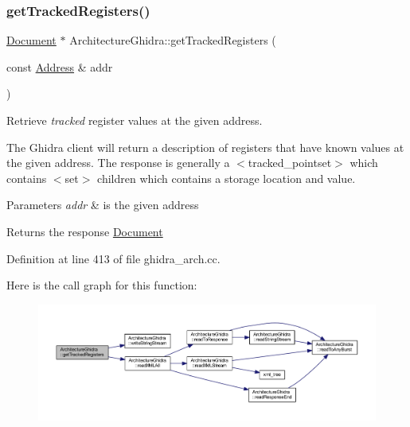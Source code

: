 \mbox{\label{class_architecture_ghidra_a124a08d65c25451f2900064445ca704f}} 
\subsubsection{\texorpdfstring{getTrackedRegisters()}{getTrackedRegisters()}}
{\footnotesize\ttfamily \mbox{\hyperlink{class_document}{Document}} $\ast$ Architecture\+Ghidra\+::get\+Tracked\+Registers (\begin{DoxyParamCaption}\item[{const \mbox{\hyperlink{class_address}{Address}} \&}]{addr }\end{DoxyParamCaption})}



Retrieve {\itshape tracked} register values at the given address. 

The Ghidra client will return a description of registers that have known values at the given address. The response is generally a $<$tracked\+\_\+pointset$>$ which contains $<$set$>$ children which contains a storage location and value. 
\begin{DoxyParams}{Parameters}
{\em addr} & is the given address \\
\hline
\end{DoxyParams}
\begin{DoxyReturn}{Returns}
the response \mbox{\hyperlink{class_document}{Document}} 
\end{DoxyReturn}


Definition at line 413 of file ghidra\+\_\+arch.\+cc.

Here is the call graph for this function\+:
\nopagebreak
\begin{figure}[H]
\begin{center}
\leavevmode
\includegraphics[width=350pt]{class_architecture_ghidra_a124a08d65c25451f2900064445ca704f_cgraph}
\end{center}
\end{figure}
\mbox{\label{class_architecture_ghidra_ad3176a91f7b9643326d94eaab5613a1c}} 
